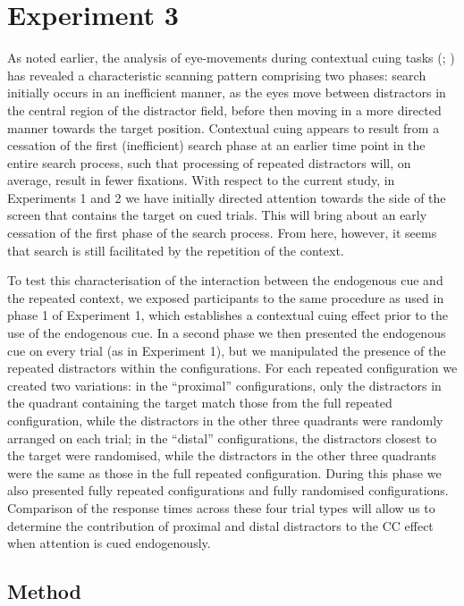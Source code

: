\documentclass[
  man,
  floatsintext,
  longtable,
  nolmodern,
  notxfonts,
  notimes,
  colorlinks=true,linkcolor=blue,citecolor=blue,urlcolor=blue]{apa7}
\begin{document}
\section{Experiment 3}\label{experiment-3}

As noted earlier, the analysis of eye-movements during contextual cuing
tasks (;
) has revealed a
characteristic scanning pattern comprising two phases: search initially
occurs in an inefficient manner, as the eyes move between distractors in
the central region of the distractor field, before then moving in a more
directed manner towards the target position. Contextual cuing appears to
result from a cessation of the first (inefficient) search phase at an
earlier time point in the entire search process, such that processing of
repeated distractors will, on average, result in fewer fixations. With
respect to the current study, in Experiments 1 and 2 we have initially
directed attention towards the side of the screen that contains the
target on cued trials. This will bring about an early cessation of the
first phase of the search process. From here, however, it seems that
search is still facilitated by the repetition of the context.

To test this characterisation of the interaction between the endogenous
cue and the repeated context, we exposed participants to the same
procedure as used in phase 1 of Experiment 1, which establishes a
contextual cuing effect prior to the use of the endogenous cue. In a
second phase we then presented the endogenous cue on every trial (as in
Experiment 1), but we manipulated the presence of the repeated
distractors within the configurations. For each repeated configuration
we created two variations: in the ``proximal'' configurations, only the
distractors in the quadrant containing the target match those from the
full repeated configuration, while the distractors in the other three
quadrants were randomly arranged on each trial; in the ``distal''
configurations, the distractors closest to the target were randomised,
while the distractors in the other three quadrants were the same as
those in the full repeated configuration. During this phase we also
presented fully repeated configurations and fully randomised
configurations. Comparison of the response times across these four trial
types will allow us to determine the contribution of proximal and distal
distractors to the CC effect when attention is cued endogenously.

\subsection{Method}\label{method-2}
\end{document}
